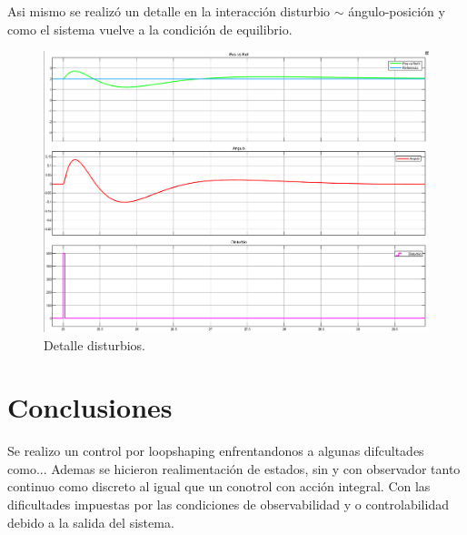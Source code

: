 Asi mismo se realizó un detalle en la interacción disturbio $\sim$ ángulo-posici\'on y como el sistema vuelve a la condici\'on de equilibrio.
\begin{figure}[H]
	\centering
	\includegraphics[width=1\linewidth]{Imagenes/Control_por_realimentacion_integral/detalle_disturbio.png}
	\caption{Detalle disturbios.}
	\label{realmentacion_disturbio}
\end{figure}


\section{Conclusiones}
Se realizo un control por loopshaping enfrentandonos a algunas difcultades como...
Ademas se hicieron realimentación de estados, sin y con observador tanto continuo como discreto al igual que un conotrol con acción integral.
Con las dificultades impuestas por las condiciones de observabilidad y o controlabilidad debido a la salida del sistema.

